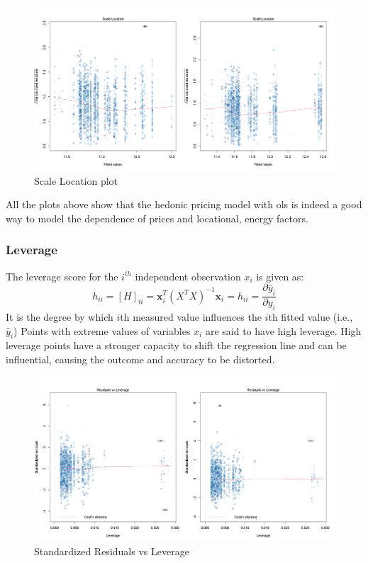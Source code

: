 \documentclass[12pt]{article}
\begin{document}
\begin{figure}[H]
    \centering
    \includegraphics[width=18cm]{3.3 images/3.3.3plot.png}
    \caption{Scale Location plot}
    \label{fig:scale}
\end{figure}

All the plots above show that the hedonic pricing model with \acrshort{ols} is indeed a good way to model the dependence of prices and locational, energy factors.

\subsubsection{Leverage}
The leverage score for the $i^{th}$ independent observation $x_i$ is given as:
$$h_{ii}=[H]_{ii}=\textbf{x}_i^T(X^TX)^{-1}\textbf{x}_i=h_{ii}=\frac{\partial \hat y_i}{\partial y_i}$$
It is the degree by which $i$th measured value influences the $i$th fitted value (i.e., $\hat y_i$)
Points with extreme values of variables $x_i$ are said to have high leverage. High leverage points have a stronger capacity to shift the regression line and can be influential, causing the outcome and accuracy to be distorted.

\begin{figure}[H]
    \centering
    \includegraphics[width=18cm]{3.3 images/3.3.4.png}
    \caption{Standardized Residuals vs Leverage}
    \label{fig:lev}
\end{figure}
\end{document}
